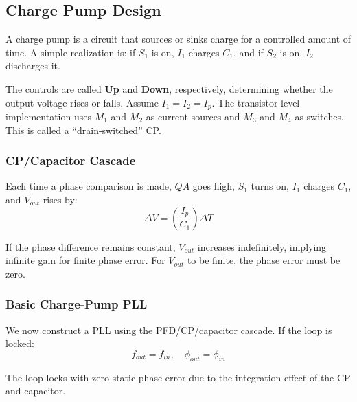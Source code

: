 \subsection{Charge Pump Design}
A charge pump is a circuit that sources or sinks charge for a controlled amount of time. A simple realization is: if $S_1$ is on, $I_1$ charges $C_1$, and if $S_2$ is on, $I_2$ discharges it.


The controls are called \textbf{Up} and \textbf{Down}, respectively, determining whether the output voltage rises or falls. Assume $I_1 = I_2 = I_p$. The transistor-level implementation uses $M_1$ and $M_2$ as current sources and $M_3$ and $M_4$ as switches. This is called a “drain-switched” CP.

\subsubsection{CP/Capacitor Cascade}
Each time a phase comparison is made, $QA$ goes high, $S_1$ turns on, $I_1$ charges $C_1$, and $V_{out}$ rises by:
\[
\Delta V = \left(\frac{I_p}{C_1}\right)\Delta T
\]


If the phase difference remains constant, $V_{out}$ increases indefinitely, implying infinite gain for finite phase error. For $V_{out}$ to be finite, the phase error must be zero.

\subsubsection{Basic Charge-Pump PLL}
We now construct a PLL using the PFD/CP/capacitor cascade. If the loop is locked:
\[
f_{out} = f_{in}, \quad \phi_{out} = \phi_{in}
\]


The loop locks with zero static phase error due to the integration effect of the CP and capacitor.

